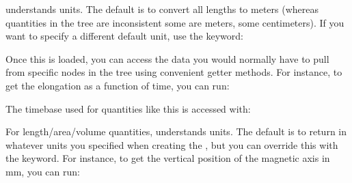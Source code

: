 \documentclass[letterpaper,10pt,english]{sphinxmanual}
\begin{document}
{\hyperref[\detokenize{eqtools:module-eqtools}]{}} understands units. The default is to convert all lengths to meters (whereas quantities in the tree are inconsistent \textendash{} some are meters, some centimeters). If you want to specify a different default unit, use the  keyword:

\begin{sphinxVerbatim}[commandchars=\\\{\}]
   
\end{sphinxVerbatim}

Once this is loaded, you can access the data you would normally have to pull from specific nodes in the tree using convenient getter methods. For instance, to get the elongation as a function of time, you can run:

\begin{sphinxVerbatim}[commandchars=\\\{\}]
  
\end{sphinxVerbatim}

The timebase used for quantities like this is accessed with:

\begin{sphinxVerbatim}[commandchars=\\\{\}]
  
\end{sphinxVerbatim}

For length/area/volume quantities, {\hyperref[\detokenize{eqtools:module-eqtools}]{}} understands units. The default is to return in whatever units you specified when creating the {\hyperref[\detokenize{eqtools:eqtools.CModEFIT.CModEFITTree}]{}}, but you can override this with the  keyword. For instance, to get the vertical position of the magnetic axis in mm, you can run:

\begin{sphinxVerbatim}[commandchars=\\\{\}]
  
\end{sphinxVerbatim}
\end{document}
